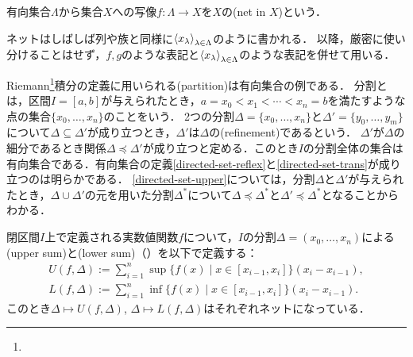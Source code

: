 \documentclass{ltjsbook}
\begin{document}
\begin{thmbox}
\begin{definition}
有向集合\(\Lambda\)から集合\(X\)への写像\(f \colon \Lambda \to X\)を\(X\)の(net in \(X\))という．
\end{definition}
\end{thmbox}

ネットはしばしば列や族と同様に\({\langle {x}_\lambda \rangle}_{\lambda \in \Lambda}\)のように書かれる．
以降，厳密に使い分けることはせず，\(f, g\)のような表記と\({\langle {x}_\lambda \rangle}_{\lambda \in \Lambda}\)のような表記を併せて用いる．

\begin{exa}
Riemann\footnote{}積分の定義に用いられる(partition)は有向集合の例である．
分割とは，区間\(I = [a, b]\)が与えられたとき，\(a = x_0 < x_1 < \cdots < x_n = b\)を満たすような点の集合\(\{x_0, \ldots, x_n\}\)のことをいう．
2つの分割\(\Delta = \{x_0, \ldots, x_n\}\)と\(\Delta' = \{y_0, \ldots, y_m\}\)について\(\Delta \subseteq \Delta' \)が成り立つとき，\(\Delta'\)は\(\Delta\)の(refinement)であるという．
\(\Delta'\)が\(\Delta\)の細分であるとき関係\(\Delta \preceq \Delta'\)が成り立つと定める．このとき\(I\)の分割全体の集合は有向集合である．有向集合の定義\ref{directed-set-reflex}と\ref{directed-set-trans}が成り立つのは明らかである．
\ref{directed-set-upper}については，分割\(\Delta\)と\(\Delta'\)が与えられたとき，\(\Delta \cup \Delta'\)の元を用いた分割\(\Delta^*\)について\(\Delta \preceq \Delta^*\)と\(\Delta' \preceq \Delta^*\)となることからわかる．

閉区間\(I\)上で定義される実数値関数\(f\)について，\(I\)の分割\(\Delta = (x_0, \ldots, x_n)\)による(upper sum)と(lower sum)（）を以下で定義する：
\begin{gather}
    U(f, \Delta) := \sum_{i = 1}^n \sup \{ f(x) \mid x \in [x_{i - 1}, x_i] \} (x_i - x_{i - 1}), \\
    L(f, \Delta) := \sum_{i = 1}^n \inf \{ f(x) \mid x \in [x_{i - 1}, x_i] \} (x_i - x_{i - 1}).
\end{gather}
このとき\(\Delta \mapsto U(f, \Delta)\), \(\Delta \mapsto L(f, \Delta)\)はそれぞれネットになっている．
\end{exa}

\end{document}
